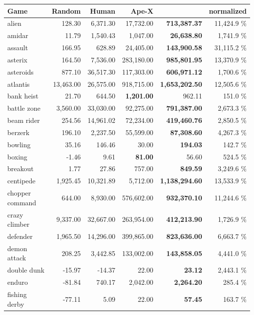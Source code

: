 \begin{center}\begin{tabularx}{0.750000\textwidth}{X| r r r r r}
\toprule
Game & Random & Human & Ape-X \cite{apex} & \muzero{} & \muzero{} normalized  \\
\midrule
alien &128.30 & 6,371.30 & 17,732.00 & \textbf{713,387.37} & 11,424.9 \%\\
amidar &11.79 & 1,540.43 & 1,047.00 & \textbf{26,638.80} & 1,741.9 \%\\
assault &166.95 & 628.89 & 24,405.00 & \textbf{143,900.58} & 31,115.2 \%\\
asterix &164.50 & 7,536.00 & 283,180.00 & \textbf{985,801.95} & 13,370.9 \%\\
asteroids &877.10 & 36,517.30 & 117,303.00 & \textbf{606,971.12} & 1,700.6 \%\\
atlantis &13,463.00 & 26,575.00 & 918,715.00 & \textbf{1,653,202.50} & 12,505.6 \%\\
bank heist &21.70 & 644.50 & \textbf{1,201.00} & 962.11 & 151.0 \%\\
battle zone &3,560.00 & 33,030.00 & 92,275.00 & \textbf{791,387.00} & 2,673.3 \%\\
beam rider &254.56 & 14,961.02 & 72,234.00 & \textbf{419,460.76} & 2,850.5 \%\\
berzerk &196.10 & 2,237.50 & 55,599.00 & \textbf{87,308.60} & 4,267.3 \%\\
bowling &35.16 & 146.46 & 30.00 & \textbf{194.03} & 142.7 \%\\
boxing &-1.46 & 9.61 & \textbf{81.00} & 56.60 & 524.5 \%\\
breakout &1.77 & 27.86 & 757.00 & \textbf{849.59} & 3,249.6 \%\\
centipede &1,925.45 & 10,321.89 & 5,712.00 & \textbf{1,138,294.60} & 13,533.9 \%\\
chopper command &644.00 & 8,930.00 & 576,602.00 & \textbf{932,370.10} & 11,244.6 \%\\
crazy climber &9,337.00 & 32,667.00 & 263,954.00 & \textbf{412,213.90} & 1,726.9 \%\\
defender &1,965.50 & 14,296.00 & 399,865.00 & \textbf{823,636.00} & 6,663.7 \%\\
demon attack &208.25 & 3,442.85 & 133,002.00 & \textbf{143,858.05} & 4,441.0 \%\\
double dunk &-15.97 & -14.37 & 22.00 & \textbf{23.12} & 2,443.1 \%\\
enduro &-81.84 & 740.17 & 2,042.00 & \textbf{2,264.20} & 285.4 \%\\
fishing derby &-77.11 & 5.09 & 22.00 & \textbf{57.45} & 163.7 \%\\

\end{tabularx}
\end{center}

